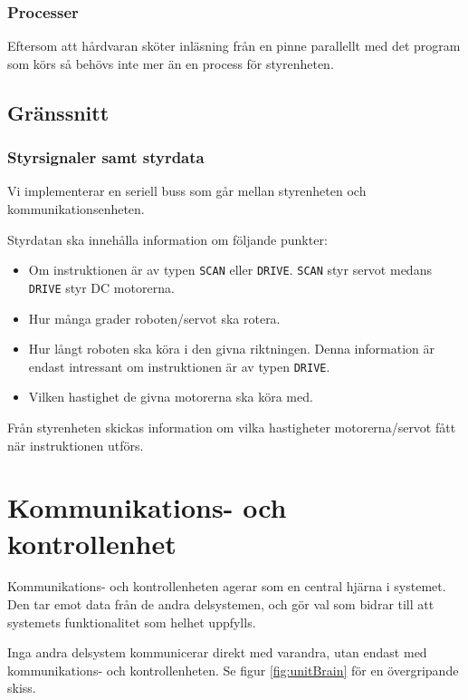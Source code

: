 \documentclass[a4paper,11pt]{article}
\begin{document}
\subsubsection{Processer}
Eftersom att hårdvaran sköter inläsning från en pinne parallellt med det program som körs så behövs inte mer än en process för styrenheten.

\clearpage

\subsection{Gränssnitt} \label{ssec:controlInterface}

\subsubsection{Styrsignaler samt styrdata}
Vi implementerar en seriell buss som går mellan styrenheten och kommunikationsenheten.

Styrdatan ska innehålla information om följande punkter:
\begin{itemize}
	\item Om instruktionen är av typen \texttt{SCAN} eller \texttt{DRIVE}. \texttt{SCAN} styr servot medans \texttt{DRIVE} styr DC motorerna.
	\item Hur många grader roboten/servot ska rotera.
	\item Hur långt roboten ska köra i den givna riktningen. Denna information är endast intressant om instruktionen är av typen \texttt{DRIVE}.
	\item Vilken hastighet de givna motorerna ska köra med.
\end{itemize}

Från styrenheten skickas information om vilka hastigheter motorerna/servot fått när instruktionen utförs.

\clearpage
\section{Kommunikations- och kontrollenhet} \label{sec:system3}

Kommunikations- och kontrollenheten agerar som en central hjärna i systemet. Den tar emot data från de andra delsystemen, och gör val som bidrar till att systemets funktionalitet som helhet uppfylls.

Inga andra delsystem kommunicerar direkt med varandra, utan endast med kommunikations- och kontrollenheten. Se figur \ref{fig:unitBrain} för en övergripande skiss.
\end{document}
